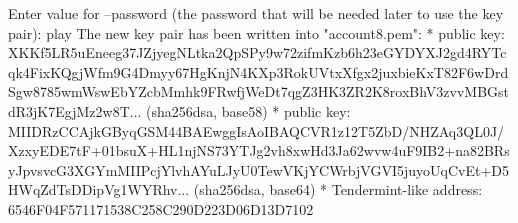 \begin{shellbox}\begin{ttlst}
Enter value for --password (the password that will be needed later to use the key pair): play
The new key pair has been written into "account8.pem":
* public key: XKKf5LR5uEneeg37JZjyegNLtka2QpSPy9w72zifmKzb6h23eGYDYXJ2gd4RYTcqk4FixKQgjWfm9G4Dmyy67HgKnjN4KXp3RokUVtxXfgx2juxbieKxT82F6wDrdSgw8785wmWswEbYZcbMmhk9FRwfjWeDt7qgZ3HK3ZR2K8roxBhV3zvvMBGstdR3jK7EgjMz2w8T... (sha256dsa, base58)
* public key: MIIDRzCCAjkGByqGSM44BAEwggIsAoIBAQCVR1z12T5ZbD/NHZAq3QL0J/XzxyEDE7tF+01bsuX+HL1njNS73YTJg2vh8xwHd3Ja62wvw4uF9IB2+na82BRsyJpvsvcG3XGYmMIIPcjYlvhAYuLJyU0TewVKjYCWrbjVGVI5juyoUqCvEt+D5HWqZdTsDDipVg1WYRhv... (sha256dsa, base64)
* Tendermint-like address: 6546F04F571171538C258C290D223D06D13D7102
\end{ttlst}\end{shellbox}
